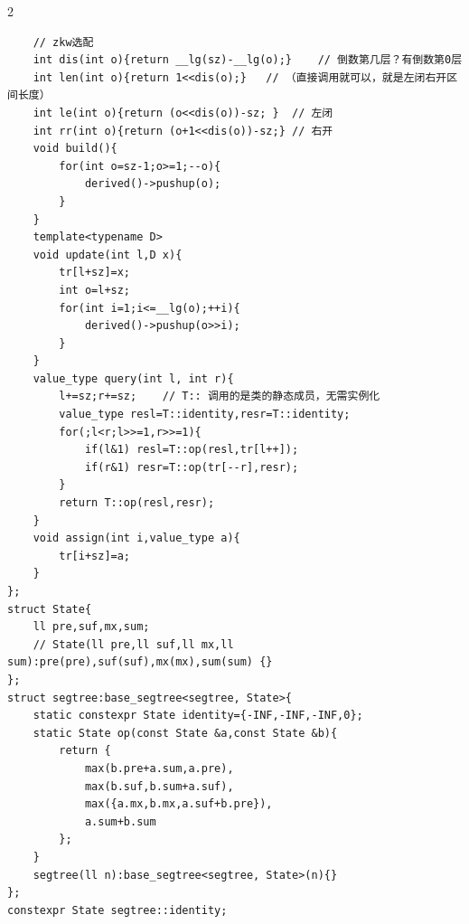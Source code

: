 \begin{multicols*}{2}
\begin{verbatim}
    // zkw选配  
    int dis(int o){return __lg(sz)-__lg(o);}    // 倒数第几层？有倒数第0层
    int len(int o){return 1<<dis(o);}   // （直接调用就可以，就是左闭右开区间长度）
    int le(int o){return (o<<dis(o))-sz; }  // 左闭
    int rr(int o){return (o+1<<dis(o))-sz;} // 右开
    void build(){
        for(int o=sz-1;o>=1;--o){
            derived()->pushup(o);
        }
    }
    template<typename D> 
    void update(int l,D x){
        tr[l+sz]=x;
        int o=l+sz;
        for(int i=1;i<=__lg(o);++i){
            derived()->pushup(o>>i);
        }
    }
    value_type query(int l, int r){
        l+=sz;r+=sz;    // T:: 调用的是类的静态成员，无需实例化
        value_type resl=T::identity,resr=T::identity;
        for(;l<r;l>>=1,r>>=1){
            if(l&1) resl=T::op(resl,tr[l++]);
            if(r&1) resr=T::op(tr[--r],resr);
        }
        return T::op(resl,resr);
    }
    void assign(int i,value_type a){
        tr[i+sz]=a;
    }
};
struct State{
    ll pre,suf,mx,sum;
    // State(ll pre,ll suf,ll mx,ll sum):pre(pre),suf(suf),mx(mx),sum(sum) {}
};
struct segtree:base_segtree<segtree, State>{
    static constexpr State identity={-INF,-INF,-INF,0};
    static State op(const State &a,const State &b){
        return {
            max(b.pre+a.sum,a.pre),
            max(b.suf,b.sum+a.suf),
            max({a.mx,b.mx,a.suf+b.pre}),
            a.sum+b.sum
        };
    }
    segtree(ll n):base_segtree<segtree, State>(n){}
};
constexpr State segtree::identity;
		\end{verbatim}


\end{multicols*}
